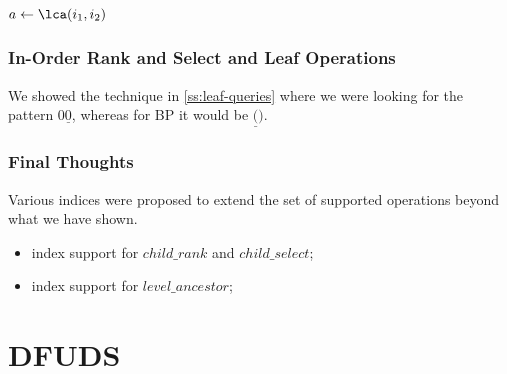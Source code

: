 \begin{algorithmic}
		\State {}
		\State {}
	\Else
		\State {}
	\EndIf
\EndFunction
\end{algorithmic}

\begin{algorithmic}
	\State $a \gets \lca(i_1, i_2)$
	\State {}
\EndFunction
\end{algorithmic}

\begin{algorithmic}
	\State {}
\EndFunction
\end{algorithmic}

\begin{algorithmic}
	\State {}
\EndFunction
\end{algorithmic}

\subsubsection{In-Order Rank and Select and Leaf Operations}




	We showed the technique in \ref{ss:leaf-queries} where we were looking for the pattern $0\underline{0}$, whereas for BP it would be $\underline{(})$.

\subsubsection{Final Thoughts}

Various indices were proposed to extend the set of supported operations beyond what we have shown.
\begin{itemize}
	\item index support for $child\_rank$ and $child\_select$;
	\item index support for $level\_ancestor$;
\end{itemize}

\section{DFUDS}

